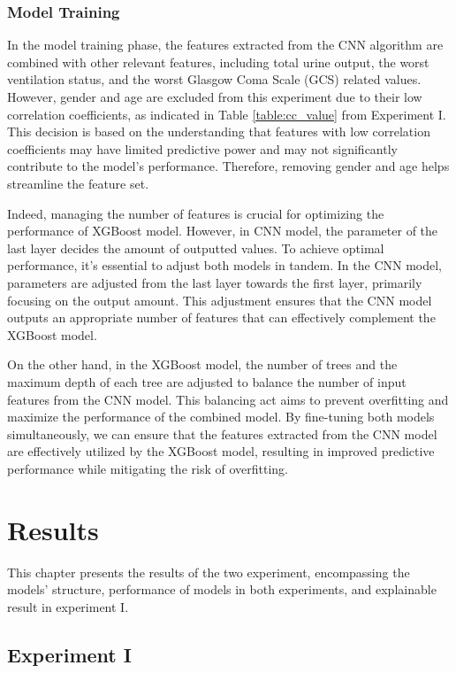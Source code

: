\documentclass[12pt,a4paper,english
]{tunithesis}
\begin{document}
\subsection{Model Training}

In the model training phase, the features extracted from the CNN algorithm are combined with other relevant features, including total urine output, the worst ventilation status, and the worst Glasgow Coma Scale (GCS) related values. However, gender and age are excluded from this experiment due to their low correlation coefficients, as indicated in Table \ref{table:cc_value} from Experiment I. This decision is based on the understanding that features with low correlation coefficients may have limited predictive power and may not significantly contribute to the model's performance. Therefore, removing gender and age helps streamline the feature set.

Indeed, managing the number of features is crucial for optimizing the performance of XGBoost model. However, in CNN model, the parameter of the last layer decides the amount of outputted values. To achieve optimal performance, it's essential to adjust both models in tandem. In the CNN model, parameters are adjusted from the last layer towards the first layer, primarily focusing on the output amount. This adjustment ensures that the CNN model outputs an appropriate number of features that can effectively complement the XGBoost model.

On the other hand, in the XGBoost model, the number of trees and the maximum depth of each tree are adjusted to balance the number of input features from the CNN model. This balancing act aims to prevent overfitting and maximize the performance of the combined model. By fine-tuning both models simultaneously, we can ensure that the features extracted from the CNN model are effectively utilized by the XGBoost model, resulting in improved predictive performance while mitigating the risk of overfitting.

\chapter{Results}
\label{ch:results}
This chapter presents the results of the two experiment, encompassing the models' structure, performance of models in both experiments, and explainable result in experiment I.

\section{Experiment I}
\end{document}

